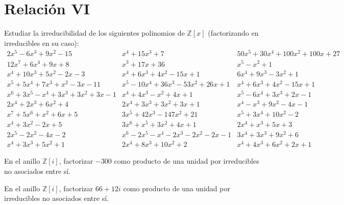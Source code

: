 \section{Relación VI}

\begin{ejercicio}
    Estudiar la irreducibilidad de los siguientes polinomios de $\mathbb{Z}[x]$ (factorizando en irreducibles en su caso):
    \begin{equation*}
        \begin{array}{lll}
            \scriptstyle 2x^5-6x^3+9x^2-15 & \scriptstyle x^4+15x^3+7 & \scriptstyle 50x^5+30x^4+100x^2+100x+27 \\
            \scriptstyle 12x^7+6x^4+9x+8 & \scriptstyle x^3+17x+36 & \scriptstyle x^5-x^2+1 \\
            \scriptstyle x^4+10x^3+5x^2-2x-3 & \scriptstyle x^4+6x^3+4x^2-15x+1 & \scriptstyle 6x^4+9x^3-3x^2+1 \\
            \scriptstyle x^5+5x^4+7x^3+x^2-3x-11 & \scriptstyle x^5-10x^4+36x^3-53x^2+26x+1 & \scriptstyle x^4+6x^3+4x^2-15x+1 \\
            \scriptstyle x^6+3x^5-x^4+3x^3+3x^2+3x-1 & \scriptstyle x^4+4x^3-x^2+4x+1 & \scriptstyle x^5-6x^4+3x^3+2x-1 \\
            \scriptstyle 2x^4+2x^3+6x^2+4 & \scriptstyle 2x^4+3x^3+3x^2+3x+1 & \scriptstyle x^4-x^3+9x^2-4x-1 \\
            \scriptstyle x^7+5x^6+x^2+6x+5 & \scriptstyle 3x^5+42x^3-147x^2+21 & \scriptstyle x^5+3x^4+10x^2-2 \\
            \scriptstyle x^4+3x^2-2x+5 & \scriptstyle 3x^6+x^5+3x^2+4x+1 & \scriptstyle 2x^4+x^3+5x+3 \\
            \scriptstyle 2x^5-2x^2-4x-2 & \scriptstyle x^6-2x^5-x^4-2x^3-2x^2-2x-1 & \scriptstyle 3x^4+3x^3+9x^2+6 \\
            \scriptstyle x^4+3x^3+5x^2+1 & \scriptstyle 2x^4+8x^3+10x^2+2 & \scriptstyle x^4+4x^3+6x^2+2x+1
        \end{array}
    \end{equation*}
\end{ejercicio}

\begin{ejercicio}
    En el anillo $\mathbb{Z}[i]$, factorizar $-300$ como producto de una unidad por irreducibles no asociados entre sí.
\end{ejercicio}

\begin{ejercicio}
    En el anillo $\mathbb{Z}[i]$, factorizar $66+12i$ como producto de una unidad por irreducibles no asociados entre sí.
\end{ejercicio}

